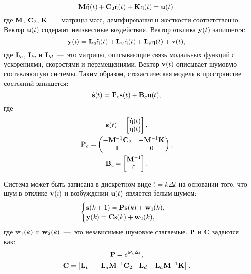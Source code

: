 \begin{equation}
	\mathbf{M} \ddot{\mathbf{\upeta}}(t) + \mathbf{C}_2 \dot{\mathbf{\upeta}}(t) + \mathbf{K} \upeta(t) = \mathbf{u}(t),
\end{equation}
где $ \mathbf{M} $, $ \mathbf{C}_2 $, $ \mathbf{K} $~---~матрицы масс, демпфирования и жесткости соответственно. Вектор $ \mathbf{u}(t) $ содержит неизвестные воздействия. Вектор отклика $ \mathbf{y}(t) $ запишется:
\begin{equation}
	\mathbf{y}(t) = \mathbf{L}_a \ddot{\mathbf{\upeta}}(t) + \mathbf{L}_v \dot{\mathbf{\upeta}}(t) + \mathbf{L}_d \upeta(t) + \mathbf{v}(t),
\end{equation}
где $ \mathbf{L}_a $, $ \mathbf{L}_v $ и $ \mathbf{L}_d $~---~это матрицы, описывающие связь модальных функций с ускорениями, скоростями и перемещениями. Вектор $ \mathbf{v}(t) $ описывает шумовую составляющую системы. Таким образом, стохастическая модель в пространстве состояний запишется:
\begin{equation}
	\dot{\mathbf{s}}(t) = \mathbf{P}_c \mathbf{s}(t) + \mathbf{B}_c \mathbf{u}(t), \label{eq:stochasticModelSSI}
\end{equation}
где 
\begin{gather}
	\mathbf{s}(t) = 
	\begin{bmatrix} 
		\dot{\mathbf{\upeta}}(t) \\ 
		\mathbf{\upeta}(t) 
	\end{bmatrix}, \\
	\mathbf{P}_c =
	\begin{pmatrix}
		-\mathbf{M} ^ {-1} \mathbf{C}_2 & -\mathbf{M} ^ {-1} \mathbf{K} \\
		 \mathbf{I} & 0
	\end{pmatrix}, \\
	\mathbf{B}_c = 
	\begin{bmatrix}
		\mathbf{M} ^ {-1} \\
		0	
	\end{bmatrix}.
\end{gather}

Система может быть записана в дискретном виде $ t = k \Delta t $ на основании того, что шум в отклике $ \mathbf{v}(t) $ и возбуждении $ \mathbf{u}(t) $ является белым шумом:
\begin{equation}
	\begin{cases}
		\mathbf{s}(k + 1) = \mathbf{P} \mathbf{s}(k) + \mathbf{w}_1(k), \\
		\mathbf{y}(k) = \mathbf{C} \mathbf{s}(k) + \mathbf{w}_2(k),
	\end{cases}
\end{equation}
где $ \mathbf{w}_1(k) $ и $ \mathbf{w}_2(k) $~---~это независимые шумовые слагаемые. $ \mathbf{P} $ и $ \mathbf{C} $ задаются как:
\begin{gather}
	\mathbf{P} = e ^ {\mathbf{P}_c \Delta t}, \\
	\mathbf{C} = 
	\begin{bmatrix} 
		\mathbf{L}_v & -\mathbf{L}_a \mathbf{M} ^ {-1} \mathbf{C}_2 & \mathbf{L}_d - \mathbf{L}_a \mathbf{M} ^ {-1} \mathbf{K}
	\end{bmatrix}.
\end{gather}

